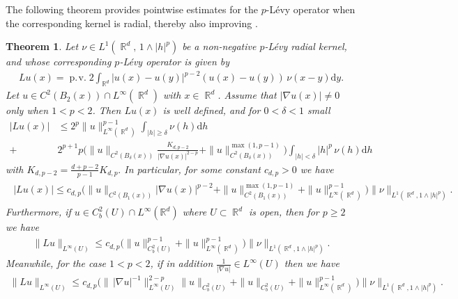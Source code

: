 \documentclass[12pt, reqno]{amsart}%
\theoremstyle{plain}  %
\newtheorem{theorem}{Theorem}[section]
\theoremstyle{definition}  %
\numberwithin{equation}{section}
\DeclareMathOperator{\pv}{\operatorname{p.\!v.}}
\DeclareMathOperator{\R}{\mathbb{R}}
\renewcommand{\d}{\mathrm{d}}
\begin{document}
\noindent The following theorem provides pointwise estimates for the $p$-L\'evy operator when the corresponding kernel is radial, thereby also improving \cite[Proposition~B.2]{Fog25}.
\begin{theorem}\label{thm:point-evalua-pLevy-rad}
Let $\nu \in L^1(\R^d,\, 1 \wedge |h|^p)$ be a non-negative $p$-L\'evy radial kernel, and whose corresponding $p$-L\'evy operator is given by
\begin{align*}
Lu(x)= \pv 2\int_{\R^d}|u(x)-u(y)|^{p-2}(u(x)-u(y))\, \nu(x-y)\d y.
\end{align*}
Let $u \in C^{2}(B_{2}(x)) \cap L^{\infty}(\R^d)$ with $x \in \R^d$. Assume that $|\nabla u(x)| \neq 0$ only when $1 < p < 2$.
Then $Lu(x)$ is well defined, and for  $0<\delta<1$ small
\begin{align*}
|Lu(x)|&\leq 2^p\|u\|^{p-1}_{L^\infty(\R^d)}\int_{|h|\geq \delta}\nu(h)\d h\\
+&2^{p+1}p\Big(\|u\|_{C^2(B_\delta(x))} \frac{K_{d,p-2}}{|\nabla u(x)|^{2-p}}+
\|u\|^{\max(1, p-1)}_{C^2(B_\delta(x))}\Big)\int_{|h|<\delta}|h|^p\, \nu(h)\d h
\end{align*}
with  $K_{d,p-2}= \tfrac{d+p-2}{p-1} K_{d,p}. $ In particular, for some constant $c_{d,p}>0$ we have
\begin{align*}
\begin{split}
|Lu(x)|\leq c_{d,p}\Big(\|u\|_{C^2(B_1(x))} |\nabla u(x)|^{p-2}+
\|u\|^{\max(1, p-1)}_{C^2(B_1(x))}+\|u\|^{p-1}_{L^\infty(\R^d)}\Big)
\|\nu\|_{L^1(\R^d,1\land|h|^p)}.
\end{split}
\end{align*}
Furthermore,  if $u \in C^{2}_b(U) \cap L^{\infty}(\mathbb{R}^d)$ where $U\subset  \R^d$ is open, then for $p\geq 2$ we have
\begin{align*}
\|Lu\|_{L^\infty(U)}\leq c_{d,p}\Big(\|u\|^{p-1}_{C^2_b(U)} + \|u\|^{p-1}_{L^\infty(\R^d)}\Big)\|\nu\|_{L^1(\R^d,1\land|h|^p)}.
\end{align*}
 Meanwhile, for the case $1<p<2$,  if in addition $\frac{1}{|\nabla u|}\in L^\infty(U)$  then  we have
\begin{align*}
\|Lu\|_{L^\infty(U)}\leq c_{d,p} \Big( \|\, |\nabla u|^{-1}\|^{2-p}_{L^\infty(U)}\|u\|_{C^2_b(U)}  +\|u\|_{C^2_b(U)}  + \|u\|^{p-1}_{L^\infty(\R^d)}\Big)\|\nu\|_{L^1(\R^d,1\land|h|^p)}.
\end{align*}
\end{theorem}
\end{document}

